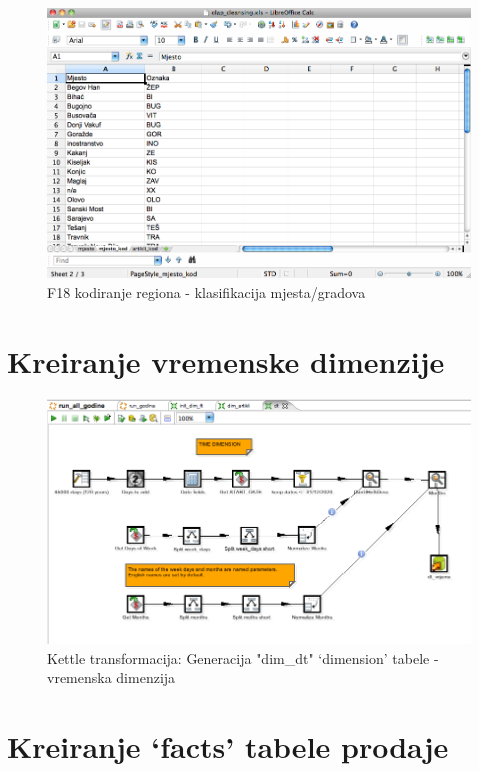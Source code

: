 \documentclass[times, utf8, seminar]{fit}
\begin{document}
\begin{figure}[H]
\centering
\includegraphics[width=15cm]{img/clean_mjesto_region.png}
\caption{F18 kodiranje regiona - klasifikacija mjesta/gradova}
\end{figure}

\section{Kreiranje vremenske dimenzije}

\begin{figure}[H]
\centering
\includegraphics[width=15cm]{img/kettle_tr_dt.png}
\caption{Kettle transformacija: Generacija "dim\_dt" `dimension' tabele - vremenska dimenzija}
\end{figure}


\section{Kreiranje `facts' tabele prodaje}
\end{document}

